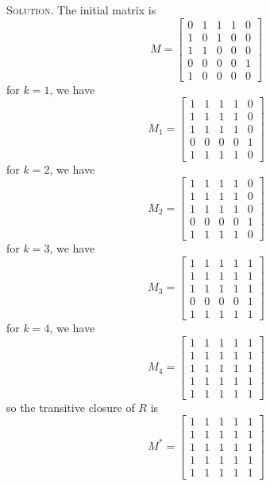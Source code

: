 \documentclass[12pt, a4paper, oneside]{article}
\newenvironment{solution}{\par\noindent\textsc{Solution. }}{\\\par}
\begin{document}
\begin{solution}
    The initial matrix is
    \[ M = \begin{bmatrix}
        0 & 1 & 1 & 1 & 0 \\
        1 & 0 & 1 & 0 & 0 \\
        1 & 1 & 0 & 0 & 0 \\
        0 & 0 & 0 & 0 & 1 \\
        1 & 0 & 0 & 0 & 0
    \end{bmatrix} \]
    for $k=1$, we have
    \[ M_1 = \begin{bmatrix}
        1 & 1 & 1 & 1 & 0 \\
        1 & 1 & 1 & 1 & 0 \\
        1 & 1 & 1 & 1 & 0 \\
        0 & 0 & 0 & 0 & 1 \\
        1 & 1 & 1 & 1 & 0 
    \end{bmatrix} \]
    for $k=2$, we have
    \[ M_2 = \begin{bmatrix}
        1 & 1 & 1 & 1 & 0 \\
        1 & 1 & 1 & 1 & 0 \\
        1 & 1 & 1 & 1 & 0 \\
        0 & 0 & 0 & 0 & 1 \\
        1 & 1 & 1 & 1 & 0 
    \end{bmatrix} \]
    for $k=3$, we have
    \[ M_3 = \begin{bmatrix}
        1 & 1 & 1 & 1 & 1 \\
        1 & 1 & 1 & 1 & 1 \\
        1 & 1 & 1 & 1 & 1 \\
        0 & 0 & 0 & 0 & 1 \\
        1 & 1 & 1 & 1 & 1 
    \end{bmatrix} \]
    for $k=4$, we have
    \[ M_4 = \begin{bmatrix}
        1 & 1 & 1 & 1 & 1 \\
        1 & 1 & 1 & 1 & 1 \\
        1 & 1 & 1 & 1 & 1 \\
        1 & 1 & 1 & 1 & 1 \\
        1 & 1 & 1 & 1 & 1 
    \end{bmatrix} \]
    so the transitive closure of $R$ is
    \[ M^* = \begin{bmatrix}
        1 & 1 & 1 & 1 & 1 \\
        1 & 1 & 1 & 1 & 1 \\
        1 & 1 & 1 & 1 & 1 \\
        1 & 1 & 1 & 1 & 1 \\
        1 & 1 & 1 & 1 & 1 
    \end{bmatrix} \] 
\end{solution}
\end{document}
